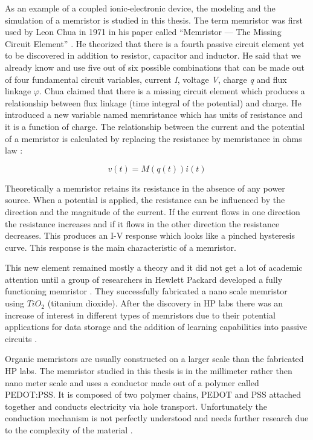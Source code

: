 \begin{doublespace}
As an example of a coupled ionic-electronic device, the modeling and the simulation of a memristor is studied in this thesis. The term memristor was first used by Leon Chua in 1971 in his paper called ``Memristor — The Missing Circuit Element'' \cite{chua}. He theorized that there is a fourth passive circuit element yet to be discovered in addition to resistor, capacitor and inductor. He said that we already know and use five out of six possible combinations that can be made out of four fundamental circuit variables, current \textit{I}, voltage \textit{V}, charge \textit{q} and flux linkage \textit{$\varphi$}. Chua claimed that there is a missing circuit element which produces a relationship between flux linkage (time integral of the potential) and charge. He introduced a new variable named memristance which has units of resistance and it is a function of charge. The relationship between the current and the potential of a memristor is calculated by replacing the resistance by memristance in ohms law \cite{memristance}:


\begin{equation}
v(t)=M(q(t))i(t)
\end{equation}

Theoretically a memristor retains its resistance in the absence of any power source. When a potential is applied, the resistance can be influenced by the direction and the magnitude of the current. If the current flows in one direction the resistance increases and if it flows in the other direction the resistance decreases. This produces an I-V response which looks like a pinched hysteresis curve. This response is the main characteristic of a memristor. 

This new element remained mostly a theory and it did not get a lot of academic attention until a group of researchers in Hewlett Packard developed a fully functioning memristor \cite{MisMem}. They successfully fabricated a nano scale memristor using $TiO_2$ (titanium dioxide). After the discovery in HP labs there was an increase of interest in different types of memristors due to their potential applications for data storage and the addition of learning capabilities into passive circuits \cite{AdaptiveMem} \cite{Synapse} \cite{CMOS}. 

Organic memristors are usually constructed on a larger scale than the  fabricated  HP labs. The memristor studied in this thesis is in the millimeter rather then nano meter scale and uses a conductor made out of a polymer called PEDOT:PSS. It is composed of two polymer chains, PEDOT and PSS attached together and conducts electricity via hole transport. Unfortunately the conduction mechanism is not perfectly understood and needs further research due to the complexity of the material \cite{PedotBook}.


\end{doublespace}
